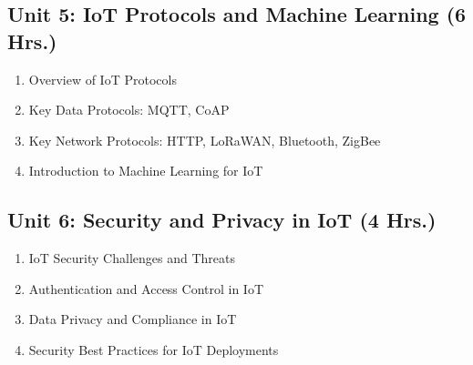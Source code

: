 \subsection*{Unit 5: IoT Protocols and Machine Learning (6 Hrs.)}
\begin{enumerate}
    \item Overview of IoT Protocols
    \item Key Data Protocols: MQTT, CoAP
    \item Key Network Protocols: HTTP, LoRaWAN, Bluetooth, ZigBee
    \item Introduction to Machine Learning for IoT
\end{enumerate}

\subsection*{Unit 6: Security and Privacy in IoT (4 Hrs.)}
\begin{enumerate}
    \item IoT Security Challenges and Threats
    \item Authentication and Access Control in IoT
    \item Data Privacy and Compliance in IoT
    \item Security Best Practices for IoT Deployments
\end{enumerate}